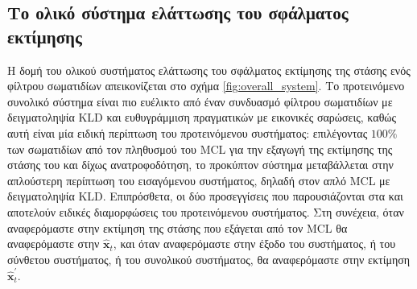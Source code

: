 \subsection{Το ολικό σύστημα ελάττωσης του σφάλματος εκτίμησης}
\label{subsection:02_02_03:04}

Η δομή του ολικού συστήματος ελάττωσης του σφάλματος εκτίμησης της στάσης ενός
φίλτρου σωματιδίων απεικονίζεται στο σχήμα \ref{fig:overall_system}.  Το
προτεινόμενο συνολικό σύστημα είναι πιο ευέλικτο από έναν συνδυασμό φίλτρου
σωματιδίων με δειγματοληψία KLD και ευθυγράμμιση πραγματικών με εικονικές
σαρώσεις, καθώς αυτή είναι μία ειδική περίπτωση του προτεινόμενου συστήματος:
επιλέγοντας $100\%$ των σωματιδίων από τον πληθυσμού του MCL για την εξαγωγή
της εκτίμησης της στάσης του και δίχως ανατροφοδότηση, το προκύπτον σύστημα
μεταβάλλεται στην απλούστερη περίπτωση του εισαγόμενου συστήματος, δηλαδή στον
απλό MCL με δειγματοληψία KLD. Επιπρόσθετα, οι δύο προσεγγίσεις που
παρουσιάζονται στα \cite{Vasiljevic2016a} και \cite{Peng2018a} αποτελούν
ειδικές διαμορφώσεις του προτεινόμενου συστήματος. Στη συνέχεια, όταν
αναφερόμαστε στην εκτίμηση της στάσης που εξάγεται από τον MCL θα αναφερόμαστε
στην $\hat{\bm{x}}_t$, και όταν αναφερόμαστε στην έξοδο του συστήματος, ή του
σύνθετου συστήματος, ή του συνολικού συστήματος, θα αναφερόμαστε στην εκτίμηση
$\hat{\bm{x}}^{\prime}_t$.

